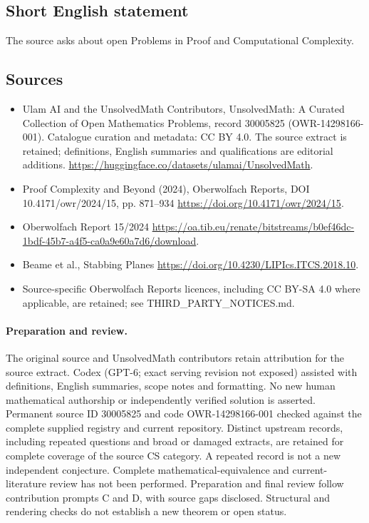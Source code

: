 \documentclass[11pt]{article}
\begin{document}
\subsection{Short English statement}
The source asks about open Problems in Proof and Computational Complexity.
\subsection{Sources}
\begin{itemize}
\item[\hypertarget{source:30005825:1}{S1}] Ulam AI and the UnsolvedMath Contributors, UnsolvedMath: A Curated Collection of Open Mathematics Problems, record 30005825 (OWR-14298166-001). Catalogue curation and metadata: CC BY 4.0. The source extract is retained; definitions, English summaries and qualifications are editorial additions.
\url{https://huggingface.co/datasets/ulamai/UnsolvedMath}.
\item[\hypertarget{source:30005825:2}{S2}] Proof Complexity and Beyond (2024), Oberwolfach Reports, DOI 10.4171/owr/2024/15, pp. 871--934
\url{https://doi.org/10.4171/owr/2024/15}.
\item[\hypertarget{source:30005825:3}{S3}] Oberwolfach Report 15/2024
\url{https://oa.tib.eu/renate/bitstreams/b0ef46dc-1bdf-45b7-a4f5-ca0a9e60a7d6/download}.
\item[\hypertarget{source:30005825:4}{S4}] Beame et al., Stabbing Planes
\url{https://doi.org/10.4230/LIPIcs.ITCS.2018.10}.
\item Source-specific Oberwolfach Reports licences, including CC BY-SA 4.0 where applicable, are retained; see THIRD\_PARTY\_NOTICES.md.
\end{itemize}
\paragraph{Preparation and review.}
The original source and UnsolvedMath contributors retain attribution for the source extract. Codex (GPT-6; exact serving revision not exposed) assisted with definitions, English summaries, scope notes and formatting. No new human mathematical authorship or independently verified solution is asserted. Permanent source ID 30005825 and code OWR-14298166-001 checked against the complete supplied registry and current repository. Distinct upstream records, including repeated questions and broad or damaged extracts, are retained for complete coverage of the source CS category. A repeated record is not a new independent conjecture. Complete mathematical-equivalence and current-literature review has not been performed. Preparation and final review follow contribution prompts C and D, with source gaps disclosed. Structural and rendering checks do not establish a new theorem or open status.
\label{end:30005825}
\end{document}
